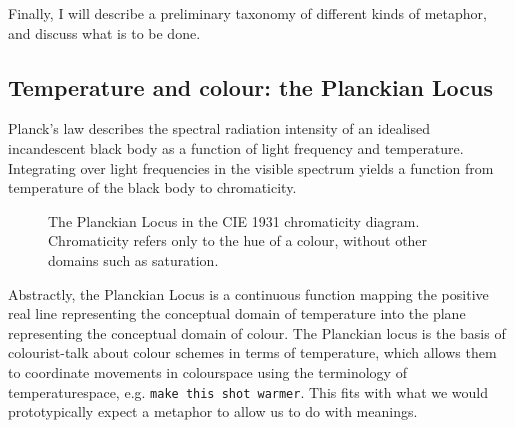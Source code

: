 Finally, I will describe a preliminary taxonomy of different kinds of metaphor, and discuss what is to be done.

\subsection{Temperature and colour: the Planckian Locus}

\begin{example}\label{ex:planck1}
Planck's law describes the spectral radiation intensity of an idealised incandescent black body as a function of light frequency and temperature. Integrating over light frequencies in the visible spectrum yields a function from temperature of the black body to chromaticity.
\begin{figure}[h]
\centering
{}
\caption{The Planckian Locus in the CIE 1931 chromaticity diagram. Chromaticity refers only to the hue of a colour, without other domains such as saturation.}
\end{figure}
\end{example}

Abstractly, the Planckian Locus is a continuous function mapping the positive real line representing the conceptual domain of temperature into the plane representing the conceptual domain of colour. The Planckian locus is the basis of colourist-talk about colour schemes in terms of temperature, which allows them to coordinate movements in colourspace using the terminology of temperaturespace, e.g. \texttt{make this shot warmer}. This fits with what we would prototypically expect a metaphor to allow us to do with meanings.


